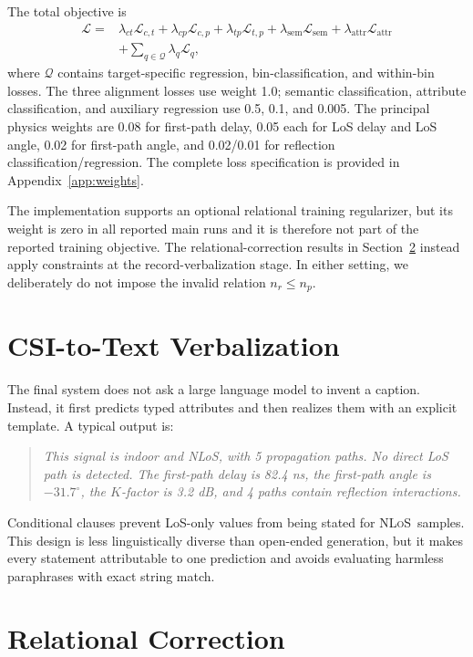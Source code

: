 \documentclass{article}
\newcommand{\nlos}{\textsc{NLoS}}
\begin{document}
The total objective is
\begin{align}
\mathcal{L}={}&
\lambda_{ct}\mathcal{L}_{c,t}+
\lambda_{cp}\mathcal{L}_{c,p}+
\lambda_{tp}\mathcal{L}_{t,p}+
\lambda_{\mathrm{sem}}\mathcal{L}_{\mathrm{sem}}+
\lambda_{\mathrm{attr}}\mathcal{L}_{\mathrm{attr}} \nonumber\\
&+\sum_{q\in\mathcal{Q}}\lambda_q\mathcal{L}_q,
\end{align}
where $\mathcal{Q}$ contains target-specific regression, bin-classification, and within-bin losses.
The three alignment losses use weight 1.0; semantic classification, attribute classification, and auxiliary regression use 0.5, 0.1, and 0.005.
The principal physics weights are 0.08 for first-path delay, 0.05 each for LoS delay and LoS angle, 0.02 for first-path angle, and 0.02/0.01 for reflection classification/regression.
The complete loss specification is provided in Appendix~\ref{app:weights}.

The implementation supports an optional relational training regularizer, but its weight is zero in all reported main runs and it is therefore not part of the reported training objective.
The relational-correction results in Section~\ref{sec:correction} instead apply constraints at the record-verbalization stage.
In either setting, we deliberately do not impose the invalid relation $n_r\le n_p$.

\section{CSI-to-Text Verbalization}
\label{sec:verbalization}

The final system does not ask a large language model to invent a caption.
Instead, it first predicts typed attributes and then realizes them with an explicit template.
A typical output is:
\begin{quote}\small
\emph{This signal is indoor and NLoS, with 5 propagation paths. No direct LoS path is detected. The first-path delay is 82.4 ns, the first-path angle is $-31.7^\circ$, the $K$-factor is 3.2 dB, and 4 paths contain reflection interactions.}
\end{quote}
Conditional clauses prevent LoS-only values from being stated for \nlos\ samples.
This design is less linguistically diverse than open-ended generation, but it makes every statement attributable to one prediction and avoids evaluating harmless paraphrases with exact string match.

\section{Relational Correction}
\label{sec:correction}
\end{document}
